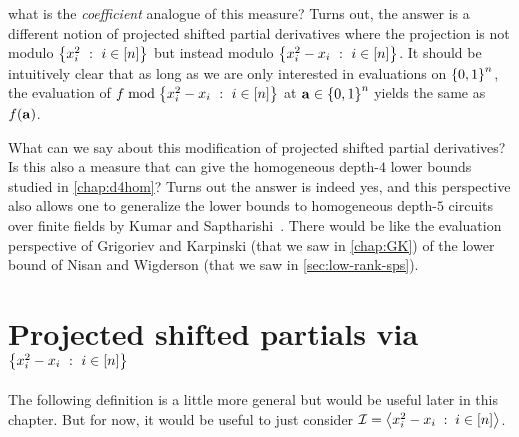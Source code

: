 
\noindent
what is the \emph{coefficient} analogue of this measure?
Turns out, the answer is a different notion of projected shifted partial derivatives where the projection is not modulo $\left\{{x_i^2}\ : \ {i\in [n]}\right\}$ but instead modulo $\left\{{x_i^2 - x_i}\ : \ {i\in [n]}\right\}$.
It should be intuitively clear that as long as we are only interested in evaluations on $\left\{0,1\right\}^n$, the evaluation of  $f \bmod \left\{{x_i^2 - x_i}\ : \ {i\in [n]}\right\}$ at $\mathbf{a}\in \left\{0,1\right\}^n$ yields the same  as $f(\mathbf{a})$. 

What can we say about this modification of projected shifted partial derivatives? Is this also a measure that can give the homogeneous depth-$4$ lower bounds studied in \autoref{chap:d4hom}? Turns out the answer is indeed yes, and this perspective also allows one to generalize the lower bounds to homogeneous depth-$5$ circuits over finite fields by Kumar and Saptharishi~\cite{KumarSapt15}. There would be like the evaluation perspective of Grigoriev and Karpinski \cite{grigoriev98} (that we saw in \autoref{chap:GK}) of the lower bound of Nisan and Wigderson \cite{nw1997} (that we saw in \autoref{sec:low-rank-sps}). 

\section{Projected shifted partials via $\left\{{x_i^2-x_i}\ : \ {i\in [n]}\right\}$}

The following definition is a little more general but would be useful later in this chapter. But for now, it would be useful to just consider $\mathcal{I} = \left\langle x_i^2 - x_i \;:\; i\in [n]\right\rangle$. 

